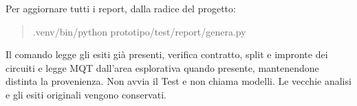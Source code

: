 Per aggiornare tutti i report, dalla radice del progetto:
\begin{quote}\small\ttfamily .venv/bin/python prototipo/test/report/genera.py\end{quote}
Il comando legge gli esiti già presenti, verifica contratto, split e impronte dei circuiti e legge MQT dall’area esplorativa quando presente, mantenendone distinta la provenienza. Non avvia il Test e non chiama modelli. Le vecchie analisi e gli esiti originali vengono conservati.

